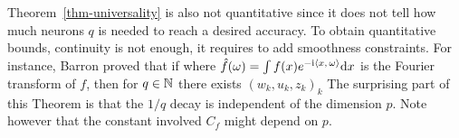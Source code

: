 Theorem~\ref{thm-universality} is also not quantitative since it does not tell how much neurons $q$ is needed to reach a desired accuracy. To obtain quantitative bounds, continuity is not enough, it requires to add smoothness constraints. For instance, Barron proved that if 
where $\hat f(\omega) = \int f(x) e^{-\mathrm{i}\langle x,\,\omega\rangle} \mathrm{d} x$ is the Fourier transform of $f$, then for $q \in \mathbb{N}$ there exists $(w_k,u_k,z_k)_{k}$
The surprising part of this Theorem is that the $1/q$ decay is independent of the dimension $p$. Note however that the constant involved $C_f$ might depend on $p$. 


